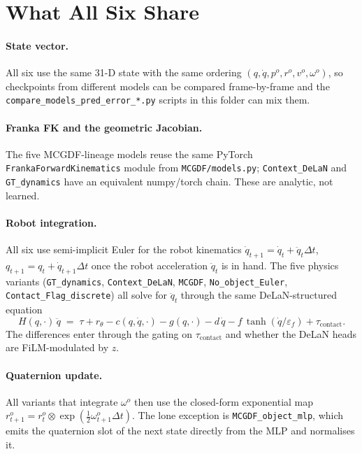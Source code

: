 \documentclass[11pt]{article}
\begin{document}
\section{What All Six Share}

\paragraph{State vector.}
All six use the same 31-D state with the same ordering
\((q, \dot q, p^o, r^o, v^o, \omega^o)\), so checkpoints from different
models can be compared frame-by-frame and the
\texttt{compare\_models\_pred\_error\_*.py} scripts in this folder can
mix them.

\paragraph{Franka FK and the geometric Jacobian.}
The five MCGDF-lineage models reuse the same PyTorch
\texttt{FrankaForwardKinematics} module from
\texttt{MCGDF/models.py}; \texttt{Context\_DeLaN} and
\texttt{GT\_dynamics} have an equivalent numpy/torch chain.  These
are analytic, not learned.

\paragraph{Robot integration.}
All six use semi-implicit Euler for the robot kinematics
$\dot q_{t+1} = \dot q_t + \ddot q_t \Delta t$,
$q_{t+1} = q_t + \dot q_{t+1} \Delta t$ once the robot acceleration
$\ddot q_t$ is in hand.  The five physics variants
(\texttt{GT\_dynamics}, \texttt{Context\_DeLaN}, \texttt{MCGDF},
\texttt{No\_object\_Euler}, \texttt{Contact\_Flag\_discrete}) all
solve for $\ddot q_t$ through the same DeLaN-structured equation
\begin{equation}
  H(q, \cdot)\,\ddot q
  \;=\;
  \tau + r_\theta - c(q, \dot q, \cdot) - g(q, \cdot)
  - d\,\dot q - f\,\tanh(\dot q / \varepsilon_f) + \tau_{\mathrm{contact}}.
  \label{eq:cmp-robot}
\end{equation}
The differences enter through the gating on $\tau_{\mathrm{contact}}$
and whether the DeLaN heads are FiLM-modulated by $z$.

\paragraph{Quaternion update.}
All variants that integrate $\omega^o$ then use the closed-form
exponential map
$r^o_{t+1} = r^o_t \otimes \exp(\tfrac12 \omega^o_{t+1} \Delta t)$.
The lone exception is \texttt{MCGDF\_object\_mlp}, which emits the
quaternion slot of the next state directly from the MLP and
normalises it.
\end{document}
